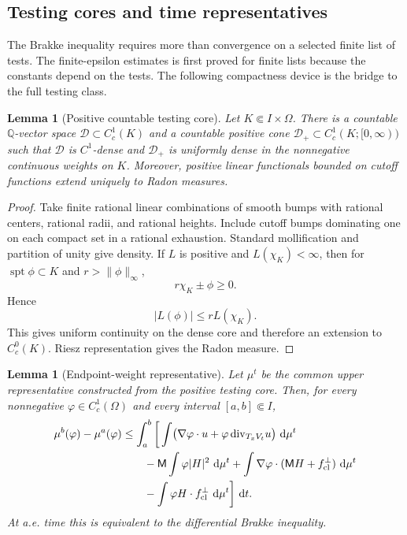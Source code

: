 \documentclass[11pt]{article}
\newtheorem{lemma}[theorem]{Lemma}
\theoremstyle{definition}
\newcommand{\dd}{\,\mathrm d}
\newcommand{\Mmob}{\mathsf M}
\begin{document}
\subsection{Testing cores and time representatives}

The Brakke inequality requires more than convergence on a selected finite list
of tests.  The finite-epsilon estimates is first proved for finite lists because
the constants depend on the tests.  The following compactness device is the
bridge to the full testing class.

\begin{lemma}[Positive countable testing core]
\label{lem:app-positive-core}
Let \(K\Subset I\times\Omega\).  There is a countable
\(\mathbb Q\)-vector space \(\mathcal D\subset C_c^1(K)\) and a countable
positive cone \(\mathcal D_+\subset C_c^1(K;[0,\infty))\) such that
\(\mathcal D\) is \(C^1\)-dense and \(\mathcal D_+\) is uniformly dense in
the nonnegative continuous weights on \(K\).  Moreover, positive linear
functionals bounded on cutoff functions extend uniquely to Radon measures.
\end{lemma}

\begin{proof}
Take finite rational linear combinations of smooth bumps with rational centers,
rational radii, and rational heights.  Include cutoff bumps dominating one on
each compact set in a rational exhaustion.  Standard mollification and
partition of unity give density.  If \(L\) is positive and \(L(\chi_K)<\infty\),
then for \(\operatorname{spt}\phi\subset K\) and \(r>\|\phi\|_\infty\),
\[
        r\chi_K\pm\phi\ge0 .
\]
Hence
\[
        |L(\phi)|\le rL(\chi_K).
\]
This gives uniform continuity on the dense core and therefore an extension to
\(C_c^0(K)\).  Riesz representation gives the Radon measure.
\end{proof}

\begin{lemma}[Endpoint-weight representative]
\label{lem:app-endpoint-rep}
Let \(\mu^t\) be the common upper representative constructed from the positive
testing core.  Then, for every nonnegative
\(\varphi\in C_c^1(\Omega)\) and every interval \([a,b]\Subset I\),
\[
\begin{aligned}
\mu^b(\varphi)-\mu^a(\varphi)
&\le
\int_a^b
\bigg[
 \int
 \bigl(\nabla\varphi\cdot u
 +\varphi\,{\rm div}_{T_xV_t}u\bigr)\,\dd\mu^t
\\
&\qquad
 -\Mmob\int\varphi |H|^2\,\dd\mu^t
 +\int\nabla\varphi\cdot(\Mmob H+f_{\rm cl}^\perp)\,\dd\mu^t
\\
&\qquad
 -\int\varphi H\cdot f_{\rm cl}^\perp\,\dd\mu^t
\bigg]\,\dd t .
\end{aligned}
\]
At a.e. time this is equivalent to the differential Brakke inequality.
\end{lemma}
\end{document}
